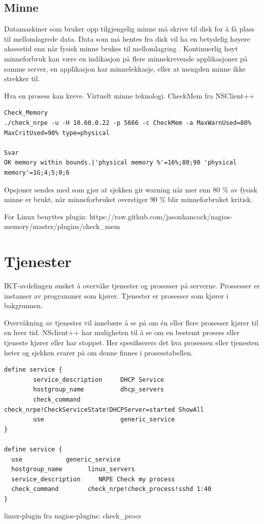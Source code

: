 \subsection{Minne}
Datamaskiner som bruker opp tilgjengelig minne må skrive til disk for å få plass til mellomlagrede data. Data som må hentes fra disk vil ha en betydelig høyere aksesstid enn når fysisk minne brukes til mellomlagring \cite{wiki:mem}. 
Kontinuerlig høyt minneforbruk kan være en indikasjon på flere minnekrevende applikasjoner på samme server, en applikasjon har minnelekkasje, eller at mengden minne ikke strekker til.

Hva en prosess kan kreve. Virtuelt minne teknologi. CheckMem fra NSClient++

\begin{lstlisting}
Check_Memory
./check_nrpe -u -H 10.60.0.22 -p 5666 -c CheckMem -a MaxWarnUsed=80% MaxCritUsed=90% type=physical

Svar
OK memory within bounds.|'physical memory %'=16%;80;90 'physical memory'=1G;4;5;0;6
\end{lstlisting}

Opsjoner sendes med som gjør at sjekken gir warning når mer enn 80 \% av fysisk minne er brukt, når minneforbruket overstiger 90 \% blir minneforbruket kritisk.

For Linux benyttes plugin: https://raw.github.com/jasonhancock/nagios-memory/master/plugins/check\_mem

\section{Tjenester}
IKT-avdelingen ønsket å overvåke tjenester og prosesser på serverne. Prossesser er instanser av programmer som kjører. Tjenester er prosesser som kjører i bakgrunnen. 

Overvåkning av tjenester vil innebære å se på om én eller flere prosesser kjører
til en hver tid. NSclient++ har muligheten til å se om en bestemt prosess eller tjeneste kjører eller har stoppet. Her spesifiserers det hva prosessen eller tjenesten heter og sjekken svarer på om denne finnes i prosesstabellen.
\begin{lstlisting}
define service {
        service_description     DHCP Service
        hostgroup_name          dhcp_servers
        check_command           check_nrpe!CheckServiceState!DHCPServer=started ShowAll
        use                     generic_service
}

define service {
  use            generic_service
  hostgroup_name       linux_servers
  service_description     NRPE Check my process
  check_command        check_nrpe!check_process!sshd 1:40
}
\end{lstlisting}
linux-plugin fra nagios-plugins: check\_procs 

